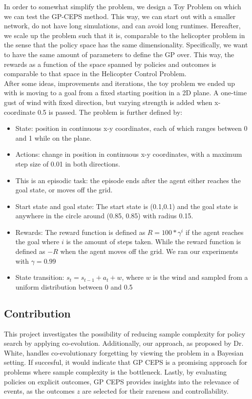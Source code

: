 In order to somewhat simplify the problem, we design a Toy Problem on which we can test the GP-CEPS method. This way, we can start out with a smaller network, do not have long simulations, and can avoid long runtimes. Hereafter, we scale up the problem such that it is, comparable to the helicopter problem in the sense that the policy space has the same dimensionality. Specifically, we want to have the same amount of parameters to define the GP over. This way, the rewards as a function of the space spanned by policies and outcomes is comparable to that space in the Helicopter Control Problem.\\
After some ideas, improvements and iterations, the toy problem we ended up with is moving to a goal from a fixed starting position in a 2D plane. A one-time gust of wind with fixed direction, but varying strength is added when x-coordinate 0.5 is passed. The problem is further defined by:

\begin{itemize}
\item State: position in continuous x-y coordinates, each of which ranges between 0 and 1 while on the plane.
\item Actions: change in position in continuous x-y coordinates, with a maximum step size of 0.01 in both directions. 
\item This is an episodic task: the episode ends after the agent either reaches the goal state, or moves off the grid.
\item Start state and goal state: The start state is (0.1,0.1) and the goal state is anywhere in the circle around (0.85, 0.85) with radius 0.15.
\item Rewards: The reward function is defined as $R = 100 * \gamma^{i}$ if the agent reaches the goal where $i$ is the amount of steps taken. While the reward function is defined as $-R$ when the agent moves off the grid. We ran our experiments with $\gamma = 0.99$
\item State transition: $s_t = s_{t-1} + a_t + w$, where $w$ is the wind and sampled from a uniform distribution between 0 and 0.5
\end{itemize} 

\subsection{Contribution}
This project investigates the possibility of reducing sample complexity for policy search by applying co-evolution. Additionally, our approach, as proposed by Dr. White, handles co-evolutionary forgetting by viewing the problem in a Bayesian setting. If succesful, it would indicate that GP CEPS is a promising approach for problems where sample complexity is the bottleneck. Lastly, by evaluating policies on explicit outcomes, GP CEPS provides insights into the relevance of events, as the outcomes $z$ are selected for their rareness and controllability.

